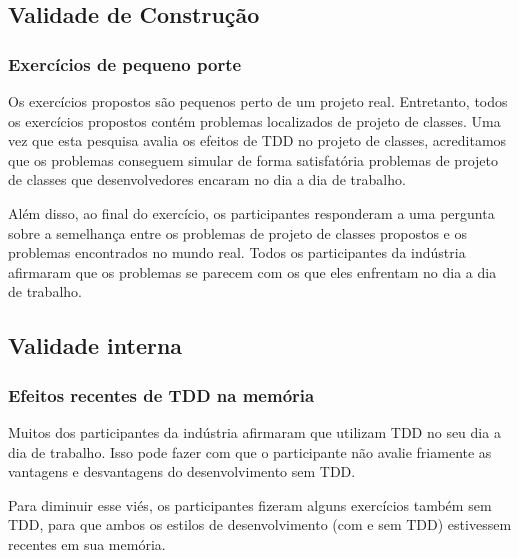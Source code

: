 \documentclass[conference]{IEEEtran}
\begin{document}
\subsection{Validade de Construção}

\subsubsection{Exercícios de pequeno porte}

Os exercícios propostos são pequenos perto de um projeto real. Entretanto, todos os exercícios propostos contém
problemas localizados de projeto de classes. Uma vez que esta pesquisa avalia os 
efeitos de TDD no projeto de classes, 
acreditamos que os problemas conseguem simular de forma satisfatória
problemas de projeto de classes que desenvolvedores encaram no dia a dia de trabalho.

Além disso, ao final do exercício, os participantes responderam a uma pergunta sobre a semelhança
entre os problemas de projeto de classes propostos e os problemas encontrados no mundo real.
Todos os participantes da indústria afirmaram que os problemas se parecem com os que eles enfrentam
no dia a dia de trabalho. 

\subsection{Validade interna}

\subsubsection{Efeitos recentes de TDD na memória}

Muitos dos participantes da indústria afirmaram que utilizam TDD no seu dia a dia de trabalho.
Isso pode fazer com que o participante
não avalie friamente as vantagens e desvantagens do desenvolvimento sem TDD. 

Para diminuir esse viés, os participantes fizeram alguns exercícios também
sem TDD, para que ambos os estilos de desenvolvimento (com e sem TDD) estivessem
recentes em sua memória.

\end{document}
